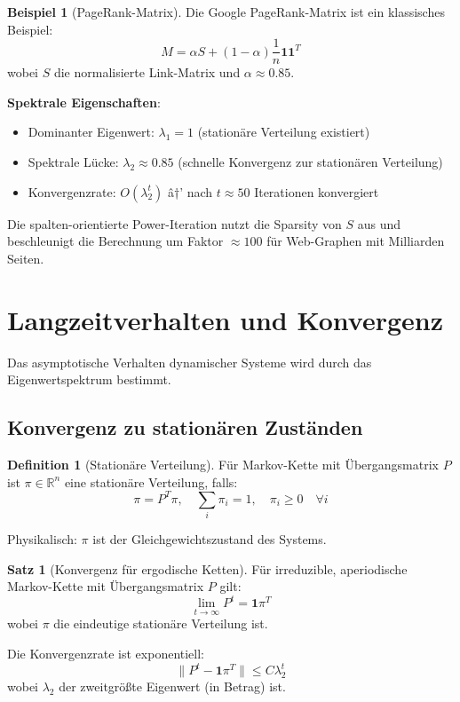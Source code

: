 ﻿\documentclass[a4paper,12pt]{report}
\theoremstyle{definition}
\newtheorem{definition}{Definition}
\newtheorem{beispiel}{Beispiel}
\newtheorem{satz}{Satz}
\begin{document}
	\begin{beispiel}[PageRank-Matrix]
		Die Google PageRank-Matrix ist ein klassisches Beispiel:
		\[
		M = \alpha S + (1-\alpha) \frac{1}{n} \mathbf{1}\mathbf{1}^T
		\]
		wobei $S$ die normalisierte Link-Matrix und $\alpha \approx 0.85$.
		
		\textbf{Spektrale Eigenschaften}:
		\begin{itemize}
			\item Dominanter Eigenwert: $\lambda_1 = 1$ (stationäre Verteilung existiert)
			\item Spektrale Lücke: $\lambda_2 \approx 0.85$ (schnelle Konvergenz zur stationären Verteilung)
			\item Konvergenzrate: $O(\lambda_2^t)$ â†’ nach $t \approx 50$ Iterationen konvergiert
		\end{itemize}
		
		Die spalten-orientierte Power-Iteration nutzt die Sparsity von $S$ aus und beschleunigt die Berechnung um Faktor $\approx 100$ für Web-Graphen mit Milliarden Seiten.
	\end{beispiel}
	
	\section{Langzeitverhalten und Konvergenz}
	
	Das asymptotische Verhalten dynamischer Systeme wird durch das Eigenwertspektrum bestimmt.
	
	\subsection{Konvergenz zu stationären Zuständen}
	
	\begin{definition}[Stationäre Verteilung]
		Für Markov-Kette mit Übergangsmatrix $P$ ist $\pi \in \mathbb{R}^n$ eine stationäre Verteilung, falls:
		\[
		\pi = P^T \pi, \quad \sum_i \pi_i = 1, \quad \pi_i \geq 0 \quad \forall i
		\]
		
		Physikalisch: $\pi$ ist der Gleichgewichtszustand des Systems.
	\end{definition}
	
	\begin{satz}[Konvergenz für ergodische Ketten]
		Für irreduzible, aperiodische Markov-Kette mit Übergangsmatrix $P$ gilt:
		\[
		\lim_{t \to \infty} P^t = \mathbf{1} \pi^T
		\]
		wobei $\pi$ die eindeutige stationäre Verteilung ist.
		
		Die Konvergenzrate ist exponentiell:
		\[
		\|P^t - \mathbf{1}\pi^T\| \leq C \lambda_2^t
		\]
		wobei $\lambda_2$ der zweitgrößte Eigenwert (in Betrag) ist.
	\end{satz}
	
\end{document}
